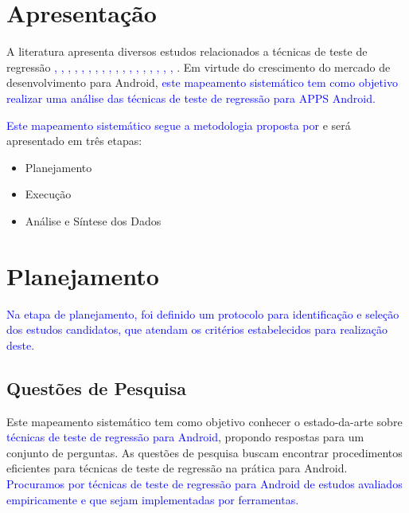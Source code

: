 
\acresetall 


\section{Apresentação}\label{sec:apresentacaoret}

A literatura apresenta diversos estudos relacionados a técnicas de teste de regressão \textcolor{blue}{\cite{536955},
\cite{65194},
\cite{630875},
\cite{Graves:2001:ESR:367008.367020},
\cite{962562},
\cite{988497},
\cite{5954416},
\cite{6339502},
\cite{Yoo:2012:RTM:2284811.2284813},
\cite{6569773},
\cite{ENGSTROM201014},
\cite{7427895},
\cite{7832883},
\cite{Do2016RedroidAR},
\cite{7927972},
\cite{8377661},
\cite{8424973},
\cite{ROMANO201862},
\cite{Choi:2018:DMA:3180155.3180173}}. Em virtude do crescimento do mercado de desenvolvimento para Android, \textcolor{blue}{este mapeamento sistemático tem como objetivo realizar uma análise das técnicas de teste de regressão para \ac{APPS} Android.} 

\textcolor{blue}{Este mapeamento sistemático segue a metodologia proposta por} \cite{Kitchenham:2015:ESE:2994449} e será apresentado em três etapas:

\begin{itemize}
    \item Planejamento
    \item Execução
    \item Análise e Síntese dos Dados
\end{itemize}

\section{Planejamento}\label{sec:planejamentoret}

\textcolor{blue}{Na etapa de planejamento, foi definido um protocolo para identificação e seleção dos estudos candidatos, que atendam os critérios estabelecidos para realização deste.}

\subsection{Questões de Pesquisa}

Este mapeamento sistemático tem como objetivo conhecer o estado-da-arte sobre \textcolor{blue}{técnicas de teste de regressão para Android}, propondo respostas para um conjunto de perguntas. As questões de pesquisa buscam encontrar procedimentos eficientes para técnicas de teste de regressão na prática para Android. \textcolor{blue}{Procuramos por técnicas de teste de regressão para Android de estudos avaliados empiricamente e que sejam implementadas por ferramentas.}

